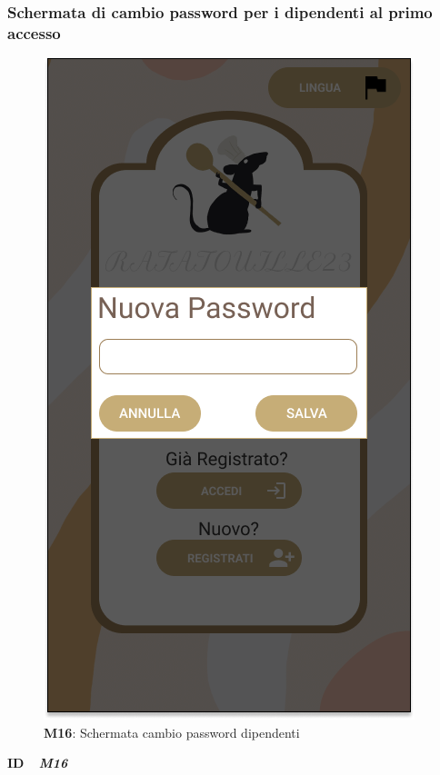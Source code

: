                 \subsubsection{Schermata di cambio password per i dipendenti al primo accesso}
                    \begin{figure}[H]
                      \centering
                      \includegraphics[scale=0.35]{assets/diagrammi/Mockup/Mockup_WorkerChangePass.png}
                      \caption*{\textbf{M16}: Schermata cambio password dipendenti}\label{fig:Mockup_WorkerChangePass}
                    \end{figure}
          
                    \begin{flushleft}
                      \textbf{ID}   \ \Large{ \emph{\textbf{M16}}}
                    \end{flushleft}
          
